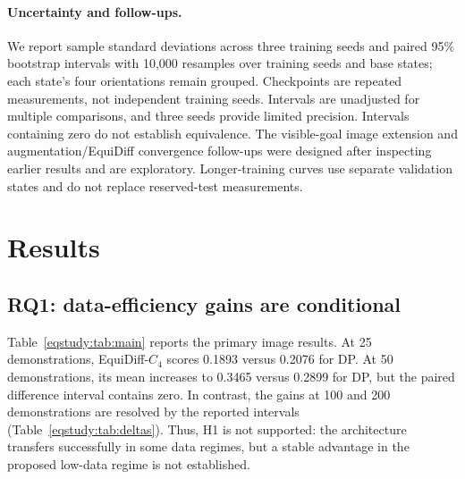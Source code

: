 \paragraph{Uncertainty and follow-ups.}
We report sample standard deviations across three training seeds and paired
95\% bootstrap intervals with 10,000 resamples over training seeds and base
states; each state's four orientations remain grouped. Checkpoints are
repeated measurements, not independent training seeds. Intervals are
unadjusted for multiple comparisons, and three seeds provide limited
precision. Intervals containing zero do not establish equivalence.
The visible-goal image extension and augmentation/EquiDiff convergence
follow-ups were designed after inspecting earlier results and are
exploratory. Longer-training curves use separate validation states and do
not replace reserved-test measurements.

\section{Results}
\label{eqstudy:sec:results}
\subsection{RQ1: data-efficiency gains are conditional}
Table~\ref{eqstudy:tab:main} reports the primary image results.
At 25 demonstrations, EquiDiff-$C_4$ scores 0.1893 versus 0.2076 for DP.
At 50 demonstrations, its mean increases to 0.3465 versus 0.2899 for DP,
but the paired difference interval contains zero. In contrast, the gains
at 100 and 200 demonstrations are resolved by the reported intervals
(Table~\ref{eqstudy:tab:deltas}). Thus, H1 is not supported: the
architecture transfers successfully in some data regimes, but a stable
advantage in the proposed low-data regime is not established.

\begin{table}[t]
\centering
\caption{Primary image-policy test coverage. Entries are the retained-checkpoint
mean $\pm$ sample standard deviation across three training seeds. Bold marks
the largest mean, not significance against every other arm.}
\label{eqstudy:tab:main}
\end{table}

